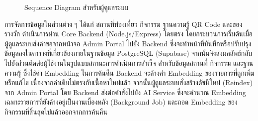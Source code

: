 \begin{figure}[H]
\centering
{}
\caption{Sequence Diagram สำหรับผู้ดูแลระบบ}
\label{fig:sequence_admin}
\end{figure}

การจัดการข้อมูลในส่วนต่าง ๆ ได้แก่ สถานที่ท่องเที่ยว กิจกรรม ฐานความรู้ QR Code และของรางวัล ดำเนินการผ่าน Core Backend (Node.js/Express) โดยตรง โดยกระบวนการเริ่มต้นเมื่อผู้ดูแลระบบส่งคำขอจากหน้าจอ Admin Portal ไปยัง Backend ซึ่งจะทำหน้าที่บันทึกหรือปรับปรุงข้อมูลลงในตารางที่เกี่ยวข้องภายในฐานข้อมูล PostgreSQL (Supabase) จากนั้นจึงส่งผลลัพธ์กลับไปยังส่วนติดต่อผู้ใช้งานในรูปแบบสถานะการดำเนินการสำเร็จ สำหรับข้อมูลสถานที่ กิจกรรม และฐานความรู้ ซึ่งใช้ค่า Embedding ในการค้นคืน Backend จะล้างค่า Embedding ของรายการที่ถูกเพิ่มหรือแก้ไข เนื่องจากค่าเดิมไม่ตรงกับเนื้อหาใหม่แล้ว จากนั้นผู้ดูแลระบบสั่งสร้างดัชนีใหม่ (Reindex) จาก Admin Portal โดย Backend ส่งต่อคำสั่งไปยัง AI Service ซึ่งจะคำนวณ Embedding เฉพาะรายการที่ยังค้างอยู่เป็นงานเบื้องหลัง (Background Job) และถอด Embedding ของกิจกรรมที่สิ้นสุดไปแล้วออกจากการค้นคืน

